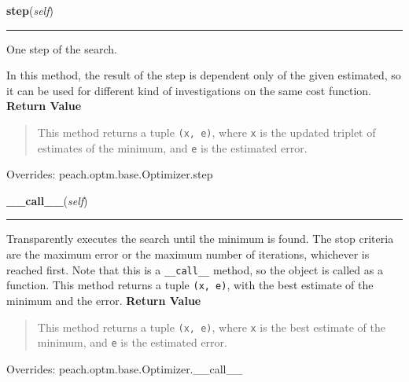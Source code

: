\hspace{.8\funcindent}\begin{boxedminipage}{\funcwidth}

    \raggedright \textbf{step}(\textit{self})

    \vspace{-1.5ex}

    \rule{\textwidth}{0.5\fboxrule}
\setlength{\parskip}{2ex}

One step of the search.

In this method, the result of the step is dependent only of the given
estimated, so it can be used for different kind of investigations on the
same cost function.
\setlength{\parskip}{1ex}
      \textbf{Return Value}
    \vspace{-1ex}

      \begin{quote}

This method returns a tuple \texttt{(x, e)}, where \texttt{x} is the updated
triplet of estimates of the minimum, and \texttt{e} is the estimated error.
      \end{quote}

      Overrides: peach.optm.base.Optimizer.step

    \end{boxedminipage}

    \vspace{0.5ex}

\hspace{.8\funcindent}\begin{boxedminipage}{\funcwidth}

    \raggedright \textbf{\_\_call\_\_}(\textit{self})

    \vspace{-1.5ex}

    \rule{\textwidth}{0.5\fboxrule}
\setlength{\parskip}{2ex}

Transparently executes the search until the minimum is found. The stop
criteria are the maximum error or the maximum number of iterations,
whichever is reached first. Note that this is a \texttt{\_\_call\_\_} method, so
the object is called as a function. This method returns a tuple
\texttt{(x, e)}, with the best estimate of the minimum and the error.
\setlength{\parskip}{1ex}
      \textbf{Return Value}
    \vspace{-1ex}

      \begin{quote}

This method returns a tuple \texttt{(x, e)}, where \texttt{x} is the best
estimate of the minimum, and \texttt{e} is the estimated error.
      \end{quote}

      Overrides: peach.optm.base.Optimizer.\_\_call\_\_

    \end{boxedminipage}


